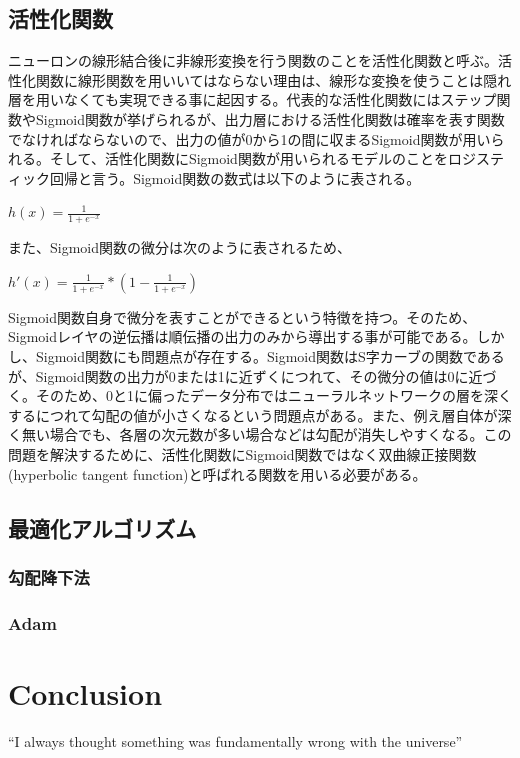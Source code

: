 \documentclass{article}
\begin{document}
\subsection{活性化関数}

ニューロンの線形結合後に非線形変換を行う関数のことを活性化関数と呼ぶ。活性化関数に線形関数を用いいてはならない理由は、線形な変換を使うことは隠れ層を用いなくても実現できる事に起因する。代表的な活性化関数にはステップ関数やSigmoid関数が挙げられるが、出力層における活性化関数は確率を表す関数でなければならないので、出力の値が0から1の間に収まるSigmoid関数が用いられる。そして、活性化関数にSigmoid関数が用いられるモデルのことをロジスティック回帰と言う。Sigmoid関数の数式は以下のように表される。



\begin{center}
\begin{math}
h(x) = \frac{1}{1+e^{-x}} 
\end{math}
\end{center}


また、Sigmoid関数の微分は次のように表されるため、

\begin{center}
\begin{math}
h'(x) = \frac{1}{1+e^{-x}} * (1 - \frac{1}{1+e^{-x}})
\end{math}
\end{center}

Sigmoid関数自身で微分を表すことができるという特徴を持つ。そのため、Sigmoidレイヤの逆伝播は順伝播の出力のみから導出する事が可能である。しかし、Sigmoid関数にも問題点が存在する。Sigmoid関数はS字カーブの関数であるが、Sigmoid関数の出力が0または1に近ずくにつれて、その微分の値は0に近づく。そのため、0と1に偏ったデータ分布ではニューラルネットワークの層を深くするにつれて勾配の値が小さくなるという問題点がある。また、例え層自体が深く無い場合でも、各層の次元数が多い場合などは勾配が消失しやすくなる。この問題を解決するために、活性化関数にSigmoid関数ではなく双曲線正接関数(hyperbolic tangent function)と呼ばれる関数を用いる必要がある。

\subsection{最適化アルゴリズム}

\subsubsection{勾配降下法}

\subsubsection{Adam}

\section{Conclusion}
``I always thought something was fundamentally wrong with the universe'' \citep{adams1995hitchhiker}



\end{document}
